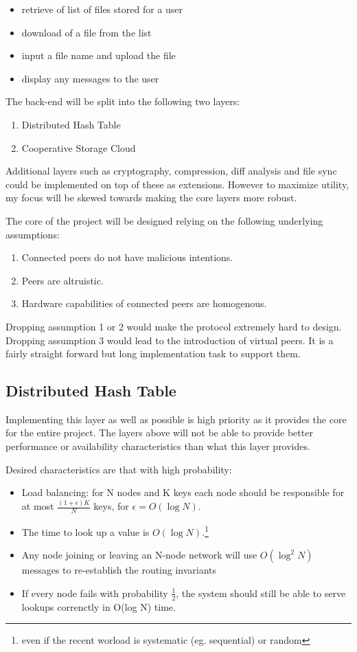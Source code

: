 \documentclass[12pt]{article}
\begin{document}
\begin{itemize}
\item{retrieve of list of files stored for a user}
\item{download of a file from the list}
\item{input a file name and upload the file}
\item{display any messages to the user}
\end{itemize}

The back-end will be split into the following two layers:

\begin{enumerate}
\item{Distributed Hash Table}
\item{Cooperative Storage Cloud}
\end{enumerate}

Additional layers such as cryptography, compression, diff analysis and file sync could be implemented on top of these as extensions. However to maximize utility, my focus will be skewed towards making the core layers more robust.

The core of the project will be designed relying on the following underlying assumptions:
\begin{enumerate}
\item{Connected peers do not have malicious intentions.}
\item{Peers are altruistic.}
\item{Hardware capabilities of connected peers are homogenous.}
\end{enumerate}

Dropping assumption 1 or 2 would make the protocol extremely hard to design. Dropping assumption 3 would lead to the introduction of virtual peers.\cite{dabekcfs}\cite{chord} It is a fairly straight forward but long implementation task to support them.

\subsection{Distributed Hash Table}
Implementing this layer as well as possible is high priority as it provides the core for the entire project. The layers above will not be able to provide better performance or availability characteristics than what this layer provides.

Desired characteristics are that with high probability:
\begin{itemize}
\item{Load balancing: for N nodes and K keys each node should be responsible for at most $\frac{(1+\epsilon)K}{N}$ keys, for $\epsilon=O(\log N)$.}
\item{The time to look up a value is $O(\log N)$.\footnote{even if the recent worload is systematic (eg. sequential) or random}}
\item{Any node joining or leaving an N-node network will use $O(\log^2 N)$ messages to re-establish the routing invariants}
\item{If every node fails with probability $\frac{1}{2}$, the system should still be able to serve lookups correnctly in O(log N) time.}
\end{itemize}
\end{document}

